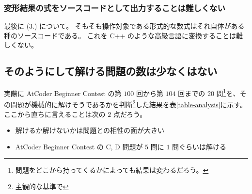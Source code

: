 \documentclass{ltjsarticle}
\begin{document}
\subsubsection{変形結果の式をソースコードとして出力することは難しくない}

最後に (3.) について。
そもそも操作対象である形式的な数式はそれ自体がある種のソースコードである。
これを C++ のような高級言語に変換することは難しくない。


\subsection{そのようにして解ける問題の数は少なくはない}

実際に AtCoder Beginner Contest の第 $100$ 回から第 $104$ 回までの $20$ 問\footnote{問題をどこから持ってくるかによっても結果は変わるだろう。}を、その問題が機械的に解けそうであるかを判断\footnote{主観的な基準で}した結果を表\ref{table-analysis}に示す。
ここから直ちに言えることは次の $2$ 点だろう。

\begin{itemize}
    \item 解けるか解けないかは問題との相性の面が大きい
    \item AtCoder Beginner Contest の C, D 問題が $5$ 問に $1$ 問ぐらいは解ける
\end{itemize}
\end{document}
